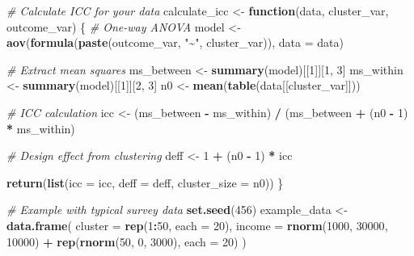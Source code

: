 \documentclass[
]{article}
\newenvironment{Shaded}{\begin{snugshade}}{\end{snugshade}}
\newcommand{\AttributeTok}[1]{\textcolor[rgb]{0.13,0.29,0.53}{#1}}
\newcommand{\CommentTok}[1]{\textcolor[rgb]{0.56,0.35,0.01}{\textit{#1}}}
\newcommand{\ControlFlowTok}[1]{\textcolor[rgb]{0.13,0.29,0.53}{\textbf{#1}}}
\newcommand{\DecValTok}[1]{\textcolor[rgb]{0.00,0.00,0.81}{#1}}
\newcommand{\FunctionTok}[1]{\textcolor[rgb]{0.13,0.29,0.53}{\textbf{#1}}}
\newcommand{\NormalTok}[1]{#1}
\newcommand{\OtherTok}[1]{\textcolor[rgb]{0.56,0.35,0.01}{#1}}
\newcommand{\SpecialCharTok}[1]{\textcolor[rgb]{0.81,0.36,0.00}{\textbf{#1}}}
\newcommand{\StringTok}[1]{\textcolor[rgb]{0.31,0.60,0.02}{#1}}
\begin{document}
\begin{Shaded}
\begin{Highlighting}[]
\CommentTok{\# Calculate ICC for your data}
\NormalTok{calculate\_icc }\OtherTok{\textless{}{-}} \ControlFlowTok{function}\NormalTok{(data, cluster\_var, outcome\_var) \{}
  \CommentTok{\# One{-}way ANOVA}
\NormalTok{  model }\OtherTok{\textless{}{-}} \FunctionTok{aov}\NormalTok{(}\FunctionTok{formula}\NormalTok{(}\FunctionTok{paste}\NormalTok{(outcome\_var, }\StringTok{"\textasciitilde{}"}\NormalTok{, cluster\_var)), }\AttributeTok{data =}\NormalTok{ data)}
  
  \CommentTok{\# Extract mean squares}
\NormalTok{  ms\_between }\OtherTok{\textless{}{-}} \FunctionTok{summary}\NormalTok{(model)[[}\DecValTok{1}\NormalTok{]][}\DecValTok{1}\NormalTok{, }\DecValTok{3}\NormalTok{]}
\NormalTok{  ms\_within }\OtherTok{\textless{}{-}} \FunctionTok{summary}\NormalTok{(model)[[}\DecValTok{1}\NormalTok{]][}\DecValTok{2}\NormalTok{, }\DecValTok{3}\NormalTok{]}
\NormalTok{  n0 }\OtherTok{\textless{}{-}} \FunctionTok{mean}\NormalTok{(}\FunctionTok{table}\NormalTok{(data[[cluster\_var]]))}
  
  \CommentTok{\# ICC calculation}
\NormalTok{  icc }\OtherTok{\textless{}{-}}\NormalTok{ (ms\_between }\SpecialCharTok{{-}}\NormalTok{ ms\_within) }\SpecialCharTok{/}\NormalTok{ (ms\_between }\SpecialCharTok{+}\NormalTok{ (n0 }\SpecialCharTok{{-}} \DecValTok{1}\NormalTok{) }\SpecialCharTok{*}\NormalTok{ ms\_within)}
  
  \CommentTok{\# Design effect from clustering}
\NormalTok{  deff }\OtherTok{\textless{}{-}} \DecValTok{1} \SpecialCharTok{+}\NormalTok{ (n0 }\SpecialCharTok{{-}} \DecValTok{1}\NormalTok{) }\SpecialCharTok{*}\NormalTok{ icc}
  
  \FunctionTok{return}\NormalTok{(}\FunctionTok{list}\NormalTok{(}\AttributeTok{icc =}\NormalTok{ icc, }\AttributeTok{deff =}\NormalTok{ deff, }\AttributeTok{cluster\_size =}\NormalTok{ n0))}
\NormalTok{\}}

\CommentTok{\# Example with typical survey data}
\FunctionTok{set.seed}\NormalTok{(}\DecValTok{456}\NormalTok{)}
\NormalTok{example\_data }\OtherTok{\textless{}{-}} \FunctionTok{data.frame}\NormalTok{(}
  \AttributeTok{cluster =} \FunctionTok{rep}\NormalTok{(}\DecValTok{1}\SpecialCharTok{:}\DecValTok{50}\NormalTok{, }\AttributeTok{each =} \DecValTok{20}\NormalTok{),}
  \AttributeTok{income =} \FunctionTok{rnorm}\NormalTok{(}\DecValTok{1000}\NormalTok{, }\DecValTok{30000}\NormalTok{, }\DecValTok{10000}\NormalTok{) }\SpecialCharTok{+} 
           \FunctionTok{rep}\NormalTok{(}\FunctionTok{rnorm}\NormalTok{(}\DecValTok{50}\NormalTok{, }\DecValTok{0}\NormalTok{, }\DecValTok{3000}\NormalTok{), }\AttributeTok{each =} \DecValTok{20}\NormalTok{)}
\NormalTok{)}


\end{Highlighting}
\end{Shaded}
\end{document}
